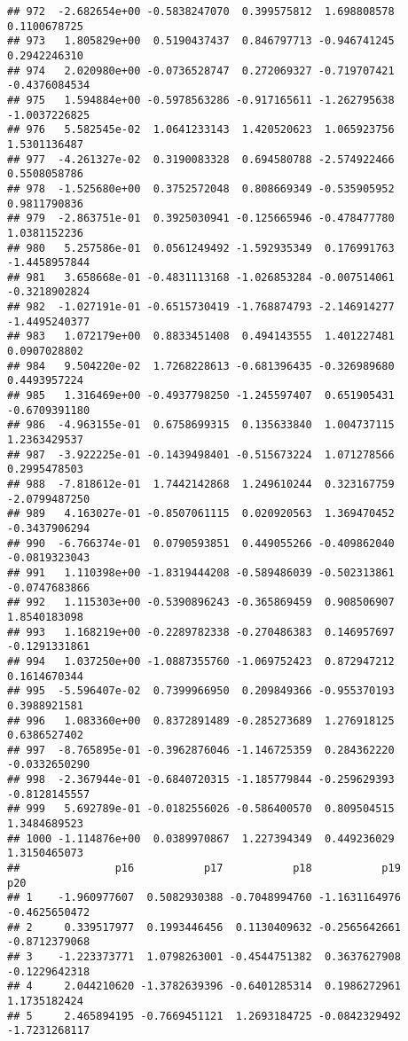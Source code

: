 \documentclass[
]{article}
\begin{document}
\begin{verbatim}
## 972  -2.682654e+00 -0.5838247070  0.399575812  1.698808578  0.1100678725
## 973   1.805829e+00  0.5190437437  0.846797713 -0.946741245  0.2942246310
## 974   2.020980e+00 -0.0736528747  0.272069327 -0.719707421 -0.4376084534
## 975   1.594884e+00 -0.5978563286 -0.917165611 -1.262795638 -1.0037226825
## 976   5.582545e-02  1.0641233143  1.420520623  1.065923756  1.5301136487
## 977  -4.261327e-02  0.3190083328  0.694580788 -2.574922466  0.5508058786
## 978  -1.525680e+00  0.3752572048  0.808669349 -0.535905952  0.9811790836
## 979  -2.863751e-01  0.3925030941 -0.125665946 -0.478477780  1.0381152236
## 980   5.257586e-01  0.0561249492 -1.592935349  0.176991763 -1.4458957844
## 981   3.658668e-01 -0.4831113168 -1.026853284 -0.007514061 -0.3218902824
## 982  -1.027191e-01 -0.6515730419 -1.768874793 -2.146914277 -1.4495240377
## 983   1.072179e+00  0.8833451408  0.494143555  1.401227481  0.0907028802
## 984   9.504220e-02  1.7268228613 -0.681396435 -0.326989680  0.4493957224
## 985   1.316469e+00 -0.4937798250 -1.245597407  0.651905431 -0.6709391180
## 986  -4.963155e-01  0.6758699315  0.135633840  1.004737115  1.2363429537
## 987  -3.922225e-01 -0.1439498401 -0.515673224  1.071278566  0.2995478503
## 988  -7.818612e-01  1.7442142868  1.249610244  0.323167759 -2.0799487250
## 989   4.163027e-01 -0.8507061115  0.020920563  1.369470452 -0.3437906294
## 990  -6.766374e-01  0.0790593851  0.449055266 -0.409862040 -0.0819323043
## 991   1.110398e+00 -1.8319444208 -0.589486039 -0.502313861 -0.0747683866
## 992   1.115303e+00 -0.5390896243 -0.365869459  0.908506907  1.8540183098
## 993   1.168219e+00 -0.2289782338 -0.270486383  0.146957697 -0.1291331861
## 994   1.037250e+00 -1.0887355760 -1.069752423  0.872947212  0.1614670344
## 995  -5.596407e-02  0.7399966950  0.209849366 -0.955370193  0.3988921581
## 996   1.083360e+00  0.8372891489 -0.285273689  1.276918125  0.6386527402
## 997  -8.765895e-01 -0.3962876046 -1.146725359  0.284362220 -0.0332650290
## 998  -2.367944e-01 -0.6840720315 -1.185779844 -0.259629393 -0.8128145557
## 999   5.692789e-01 -0.0182556026 -0.586400570  0.809504515  1.3484689523
## 1000 -1.114876e+00  0.0389970867  1.227394349  0.449236029  1.3150465073
##               p16           p17           p18           p19           p20
## 1    -1.960977607  0.5082930388 -0.7048994760 -1.1631164976 -0.4625650472
## 2     0.339517977  0.1993446456  0.1130409632 -0.2565642661 -0.8712379068
## 3    -1.223373771  1.0798263001 -0.4544751382  0.3637627908 -0.1229642318
## 4     2.044210620 -1.3782639396 -0.6401285314  0.1986272961  1.1735182424
## 5     2.465894195 -0.7669451121  1.2693184725 -0.0842329492 -1.7231268117

\end{verbatim}
\end{document}
